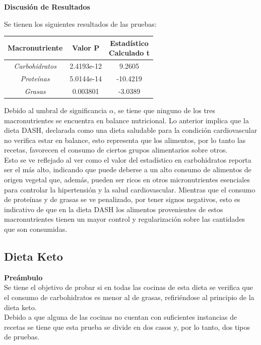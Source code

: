 \documentclass[12pt,a4paper]{article}
\begin{document}
        \textbf{Discusión de Resultados}\\
        {
            Se tienen los siguientes resultados de las pruebas:

            \begin{center}    
                \begin{tabular}{| c | c | c |}
                    \toprule
                    \textbf{Macronutriente} & \textbf{Valor P} & \makecell{\textbf{Estadístico}\\\textbf{Calculado t}} \\
                    \midrule
                    \emph{Carbohidratos} & 2.4193e-12 &   9.2605 \\
                    \emph{Proteínas}     & 5.0144e-14 & -10.4219 \\
                    \emph{Grasas}        & 0.003801   &  -3.0389 \\
                    \bottomrule
                \end{tabular}
            \end{center}

            Debido al umbral de significancia $\alpha$, se tiene que ninguno 
            de los tres macronutrientes se encuentra en balance nutricional. 
            Lo anterior implica que la dieta DASH, declarada como una dieta 
            saludable para la condición cardiovascular no verifica estar en 
            balance, esto representa que los alimentos, por lo tanto las recetas, 
            favorecen el consumo de ciertos grupos alimentarios sobre otros.\\

            Esto se ve reflejado al ver como el valor del estadístico en 
            carbohidratos reporta ser el más alto, indicando que puede deberse 
            a un alto consumo de alimentos de origen vegetal que, además, pueden 
            ser ricos en otros micronutrientes esenciales para controlar la 
            hipertensión y la salud cardiovascular. Mientras que el consumo de 
            proteínas y de grasas se ve penalizado, por tener signos negativos, 
            esto es indicativo de que en la dieta DASH los alimentos provenientes de 
            estos macronutrientes tienen un mayor control y regularización sobre 
            las cantidades que son consumidas.\\
        }

    \subsection{Dieta Keto}
        \textbf{Preámbulo}\\
        {
            Se tiene el objetivo de probar si en todas las cocinas de esta dieta 
            se verifica que el consumo de carbohidratos es menor al de grasas, 
            refiriéndose al principio de la dieta keto.\\

            Debido a que alguna de las cocinas no cuentan con suficientes instancias 
            de recetas se tiene que esta prueba se divide en dos casos y, por lo tanto, 
            dos tipos de pruebas.\\
        }
\end{document}
